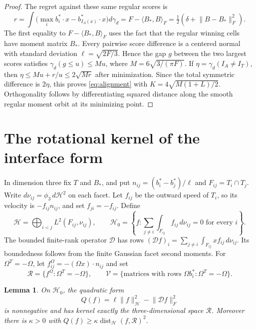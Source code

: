 \documentclass[11pt,reqno]{amsart}
\newtheorem{lemma}[theorem]{Lemma}
\theoremstyle{remark}
\newcommand{\ip}[2]{\langle #1,#2\rangle}
\newcommand{\norm}[1]{\lVert #1\rVert}
\newcommand{\ga}{\gamma}
\newcommand{\HH}{\mathcal H}
\newcommand{\DD}{\mathcal D}
\newcommand{\VV}{\mathcal V}
\newcommand{\RR}{\mathcal R}
\DeclareMathOperator{\dist}{dist}
\begin{document}
\begin{proof}
The regret against these same regular scores is
\begin{equation}\label{eq:linear-regret}
 r=\int\bigl(\max_i b_i^*\cdot x-b_{I_A(x)}^*\cdot x\bigr)d\ga_d
 =F-\ip{B_*}{B}_F
 =\tfrac12\left(\delta+\norm{B-B_*}_F^2\right).
\end{equation}
The first equality to $F-\ip{B_*}{B}_F$ uses the fact that the regular
winning cells have moment matrix $B_*$. Every pairwise score difference
is a centered normal with standard deviation $\ell=\sqrt{2F/3}$.
Hence the gap $g$ between the two largest scores satisfies
$\ga_d(g\le u)\le Mu$, where $M=6\sqrt{3/(\pi F)}$.
If $\eta=\ga_d(I_A\ne I_T)$, then
$\eta\le Mu+r/u\le2\sqrt{Mr}$ after minimization.
Since the total symmetric difference is $2\eta$, this proves
\eqref{eq:alignment} with $K=4\sqrt{M(1+L)/2}$.
Orthogonality follows by differentiating squared distance along the
smooth regular moment orbit at its minimizing point.
\end{proof}

\section{The rotational kernel of the interface form}\label{sec:interface}

In dimension three fix $T$ and $B_*$, and put
$n_{ij}=(b_i^*-b_j^*)/\ell$ and $F_{ij}=T_i\cap T_j$.
Write $d\nu_{ij}=\phi_3\,d\HH^2$ on each facet.
Let $f_{ij}$ be the outward speed of $T_i$, so its velocity is
$-f_{ij}n_{ij}$, and set $f_{ji}=-f_{ij}$.
Define
\[
 \HH=\bigoplus_{i<j}L^2(F_{ij},\nu_{ij}),\qquad
 \HH_0=\left\{f:\sum_{j\ne i}\int_{F_{ij}}f_{ij}\,d\nu_{ij}=0
                       \text{ for every }i\right\}.
\]
The bounded finite-rank operator $\DD$ has rows
$ (\DD f)_i=\sum_{j\ne i}\int_{F_{ij}}x f_{ij}\,d\nu_{ij}$.
Its boundedness follows from the finite Gaussian facet second moments.
For $\Omega^T=-\Omega$, let
$f^\Omega_{ij}=-(\Omega x)\cdot n_{ij}$ and set
\[
 \RR=\{f^\Omega:\Omega^T=-\Omega\},\qquad
 \VV=\{\text{matrices with rows }\Omega b_i^*:\Omega^T=-\Omega\}.
\]

\begin{lemma}\label{lem:interface}
On $\HH_0$, the quadratic form
\[
 Q(f)=\ell\norm{f}_{\HH}^2-\norm{\DD f}_F^2
\]
is nonnegative and has kernel exactly the three-dimensional space $\RR$.
Moreover there is $\kappa>0$ with
$Q(f)\ge\kappa\dist_{\HH}(f,\RR)^2$.
\end{lemma}
\end{document}
